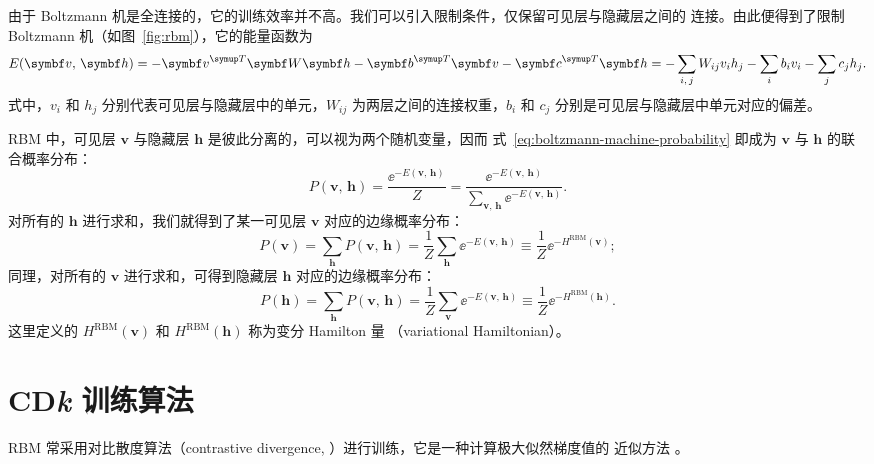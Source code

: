 由于 Boltzmann 机是全连接的，它的训练效率并不高。我们可以引入限制条件，仅保留可见层与隐藏层之间的
连接。由此便得到了限制 Boltzmann 机（如图~\ref{fig:rbm}），它的能量函数为
\cite{exact,rbmonline,chen2018equivalence}
\begin{equation}
  \label{eq:rbm-energy}
  E(\bm{v},\,\bm{h})
  = - \bm{v}^\trans \bm{W} \bm{h} - \bm{b}^\trans \bm{v} - \bm{c}^\trans \bm{h}
  = - \sum_{i,\,j} W_{ij} v_i h_j - \sum_i b_i v_i - \sum_j c_j h_j.
\end{equation}
式中，$v_i$ 和 $h_j$ 分别代表可见层与隐藏层中的单元，$W_{ij}$ 为两层之间的连接权重，$b_i$ 和 $c_j$
分别是可见层与隐藏层中单元对应的偏差。

RBM 中，可见层 $\bm{v}$ 与隐藏层 $\bm{h}$ 是彼此分离的，可以视为两个随机变量，因而
式~\eqref{eq:boltzmann-machine-probability} 即成为 $\bm{v}$ 与 $\bm{h}$ 的联合概率分布：
\begin{equation}
  P(\bm{v},\,\bm{h})
  = \frac{\ee^{-E(\bm{v},\,\bm{h})}}{Z}
  = \frac{\ee^{-E(\bm{v},\,\bm{h})}}{\sum_{\bm{v},\,\bm{h}}\ee^{-E(\bm{v},\,\bm{h})}}.
\end{equation}
对所有的 $\bm{h}$ 进行求和，我们就得到了某一可见层 $\bm{v}$ 对应的边缘概率分布：
\begin{equation}
  \label{eq:rbm-probability-v}
  P(\bm{v}) = \sum_{\bm{h}} P(\bm{v},\,\bm{h})
            = \frac{1}{Z} \sum_{\bm{h}} \ee^{-E(\bm{v},\,\bm{h})}
            \equiv \frac{1}{Z} \ee^{-H^{\text{RBM}}(\bm{v})};
\end{equation}
同理，对所有的 $\bm{v}$ 进行求和，可得到隐藏层 $\bm{h}$ 对应的边缘概率分布：
\begin{equation}
  \label{eq:rbm-probability-h}
  P(\bm{h}) = \sum_{\bm{h}} P(\bm{v},\,\bm{h})
            = \frac{1}{Z} \sum_{\bm{v}} \ee^{-E(\bm{v},\,\bm{h})}
            \equiv \frac{1}{Z} \ee^{-H^{\text{RBM}}(\bm{h})}.
\end{equation}
这里定义的 $H^{\text{RBM}}(\bm{v})$ 和 $H^{\text{RBM}}(\bm{h})$ 称为变分 Hamilton 量
（variational Hamiltonian）\cite{exact}。

\section{\texorpdfstring{CD\raisebox{0.13ex}{-}\textit{k}}{CD-k} 训练算法}
\label{sec:CDk-algorithm}

RBM 常采用对比散度算法（contrastive divergence, \CDk）进行训练，它是一种计算极大似然梯度值的
近似方法 \cite{zhouzhihua,rbmonline,lyy1994rbm,hinton2012practical,hinton2002training}。

